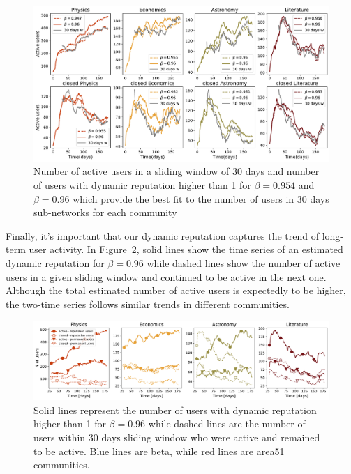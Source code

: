 \begin{figure}[H]
	\centering
	\includegraphics[width=\linewidth]{figures/stackexchange/active_users.pdf}
	\caption[Number of users in 30 days sliding window and positive reputation.]{Number of active users in a sliding window of 30 days and number of users with dynamic reputation higher than 1 for $\beta=0.954$ and $\beta=0.96 $ which provide the best fit to the number of users in 30 days sub-networks for each community}
	\label{fig:nusers}
\end{figure}

Finally, it's important that our dynamic reputation captures the trend of long-term user activity. In Figure~\ref{fig:active-users}, solid lines show the time series of an estimated dynamic reputation for $\beta = 0.96$ while dashed lines show the number of active users in a given sliding window and continued to be active in the next one. Although the total estimated number of active users is expectedly to be higher, the two-time series follows similar trends in different communities.

\begin{figure}[H]
	\centering
	\includegraphics[width=1\linewidth]{figures/stackexchange/permanent_users.pdf}
	\caption[Number of users in Stack Exchange community who remain to be active]{Solid lines represent the number of users with dynamic reputation higher than 1 for $\beta=0.96$ while dashed lines are the number of users within 30 days sliding window who were active and remained to be active. Blue lines are beta, while red lines are area51 communities.}
	\label{fig:active-users}
\end{figure}

\clearpage
